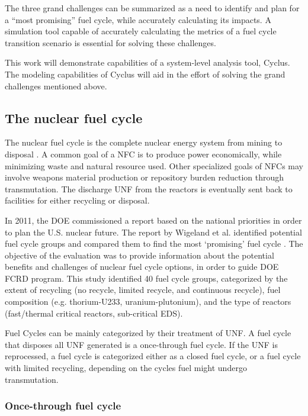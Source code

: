 The three grand challenges can be summarized as a need to
identify and plan for a ``most promising'' fuel cycle, while
accurately calculating its impacts. 
A simulation tool capable of accurately calculating the metrics
of a fuel cycle transition scenario is essential for solving these challenges.

This work will demonstrate capabilities of a system-level
analysis tool, Cyclus. The modeling capabilities of Cyclus 
will aid in the effort of solving
the grand challenges mentioned above.

\subsection{The nuclear fuel cycle}
The nuclear fuel cycle is the complete nuclear energy
system from mining to disposal \cite{tsoulfanidis_nuclear_2013}.
A common goal of
a \gls{NFC} is to produce power economically, while minimizing
waste and natural resource used. Other specialized goals of \gls{NFC}s may involve
weapons material production or repository burden reduction through transmutation.
The discharge \gls{UNF} from the reactors is eventually sent back to facilities for
either recycling or disposal.

In 2011, the \gls{DOE} commissioned a report based on the national priorities
in order to plan the U.S. nuclear future.
The report by Wigeland et al. identified potential fuel cycle groups and compared them
to find the most `promising' fuel cycle \cite{wigeland_nuclear_2014}.
The objective of the evaluation was to provide information about the
potential benefits and challenges of nuclear fuel cycle options, in order to
guide \gls{DOE} \gls{FCRD} program.
This study identified 40 fuel cycle groups, categorized by the extent of recycling
(no recycle, limited recycle, and continuous recycle), fuel composition
(e.g. thorium-U233, uranium-plutonium), and the type of reactors (fast/thermal critical
reactors, sub-critical \gls{EDS}).

Fuel Cycles can be mainly categorized by their treatment of \gls{UNF}. A
fuel cycle that disposes all \gls{UNF} generated is a once-through fuel cycle.
If the \gls{UNF} is reprocessed, a fuel cycle is categorized either as a
closed fuel cycle, or a fuel cycle with limited recycling, depending on
the cycles fuel might undergo transmutation. 

\subsubsection{Once-through fuel cycle}

